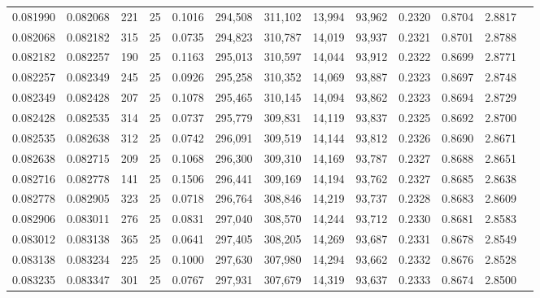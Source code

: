 \begin{tabular}{rrrrrrrrrrrrr}
0.081990 & 0.082068 &   221 &  25 &                                     0.1016 & 294,508 & 311,102 &  13,994 &  93,962 & 0.2320 & 0.8704 & 2.8817 \\
0.082068 & 0.082182 &   315 &  25 &                                     0.0735 & 294,823 & 310,787 &  14,019 &  93,937 & 0.2321 & 0.8701 & 2.8788 \\
0.082182 & 0.082257 &   190 &  25 &                                     0.1163 & 295,013 & 310,597 &  14,044 &  93,912 & 0.2322 & 0.8699 & 2.8771 \\
0.082257 & 0.082349 &   245 &  25 &                                     0.0926 & 295,258 & 310,352 &  14,069 &  93,887 & 0.2323 & 0.8697 & 2.8748 \\
0.082349 & 0.082428 &   207 &  25 &                                     0.1078 & 295,465 & 310,145 &  14,094 &  93,862 & 0.2323 & 0.8694 & 2.8729 \\
0.082428 & 0.082535 &   314 &  25 &                                     0.0737 & 295,779 & 309,831 &  14,119 &  93,837 & 0.2325 & 0.8692 & 2.8700 \\
0.082535 & 0.082638 &   312 &  25 &                                     0.0742 & 296,091 & 309,519 &  14,144 &  93,812 & 0.2326 & 0.8690 & 2.8671 \\
0.082638 & 0.082715 &   209 &  25 &                                     0.1068 & 296,300 & 309,310 &  14,169 &  93,787 & 0.2327 & 0.8688 & 2.8651 \\
0.082716 & 0.082778 &   141 &  25 &                                     0.1506 & 296,441 & 309,169 &  14,194 &  93,762 & 0.2327 & 0.8685 & 2.8638 \\
0.082778 & 0.082905 &   323 &  25 &                                     0.0718 & 296,764 & 308,846 &  14,219 &  93,737 & 0.2328 & 0.8683 & 2.8609 \\
0.082906 & 0.083011 &   276 &  25 &                                     0.0831 & 297,040 & 308,570 &  14,244 &  93,712 & 0.2330 & 0.8681 & 2.8583 \\
0.083012 & 0.083138 &   365 &  25 &                                     0.0641 & 297,405 & 308,205 &  14,269 &  93,687 & 0.2331 & 0.8678 & 2.8549 \\
0.083138 & 0.083234 &   225 &  25 &                                     0.1000 & 297,630 & 307,980 &  14,294 &  93,662 & 0.2332 & 0.8676 & 2.8528 \\
0.083235 & 0.083347 &   301 &  25 &                                     0.0767 & 297,931 & 307,679 &  14,319 &  93,637 & 0.2333 & 0.8674 & 2.8500 \\

\end{tabular}
